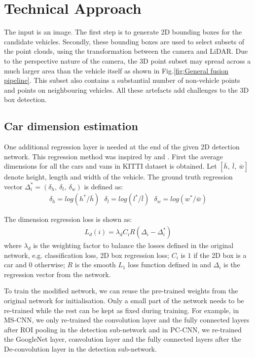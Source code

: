\documentclass[letterpaper, 10 pt, conference]{ieeeconf}  \usepackage[
\begin{document}
\section{Technical Approach}
The input is an image. The first step is to generate 2D bounding boxes for the candidate vehicles. Secondly, these bounding boxes are used to select subsets of the point clouds, using the transformation between the camera and LiDAR. Due to the perspective nature of the camera, the 3D point subset may spread across a much larger area than the vehicle itself as shown in Fig.\ref{fig:General fusion pipeline}. This subset also contains a substantial number of non-vehicle points and points on neighbouring vehicles. All these artefacts add challenges to the 3D box detection.

\subsection{Car dimension estimation}
One additional regression layer is needed at the end of the given 2D detection network. This regression method was inspired by \cite{deepmanta_cvpr17} and \cite{mousavian20163d}. First the average dimensions for all the cars and vans in KITTI dataset is obtained. Let $[\bar h, ~\bar l, ~\bar w]$ denote height, length and width of the vehicle. The ground truth regression vector $\Delta_i^* = (\delta_h,~\delta_l,~\delta_w)$ is defined as:
\begin{align}
\delta_h = log(h^*/\bar h)~~~\delta_l = log(l^*/\bar l)~~~\delta_w = log(w^*/\bar w)
\label{eq:deltas}
\end{align}

The dimension regression loss is shown as:
\begin{align}
L_d(i) = \lambda_d C_i R(\Delta_i - \Delta_i^*)
\end{align}
where $\lambda_d$ is the weighting factor to balance the losses defined in the original network, e.g. classification loss, 2D box regression loss; $C_i$ is $1$ if the 2D box is a car and $0$ otherwise; $R$ is the smooth $L_1$ loss function defined in \cite{girshick2015fast} and $\Delta_i$ is the regression vector from the network.

To train the modified network, we can reuse the pre-trained weights from the original network for initialisation. Only a small part of the network needs to be re-trained while the rest can be kept as fixed during training. For example, in MS-CNN, we only re-trained the convolution layer and the fully connected layers after ROI pooling in the detection sub-network and in PC-CNN, we re-trained the GoogleNet layer, convolution layer and the fully connected layers after the De-convolution layer in the detection sub-network.
\end{document}
